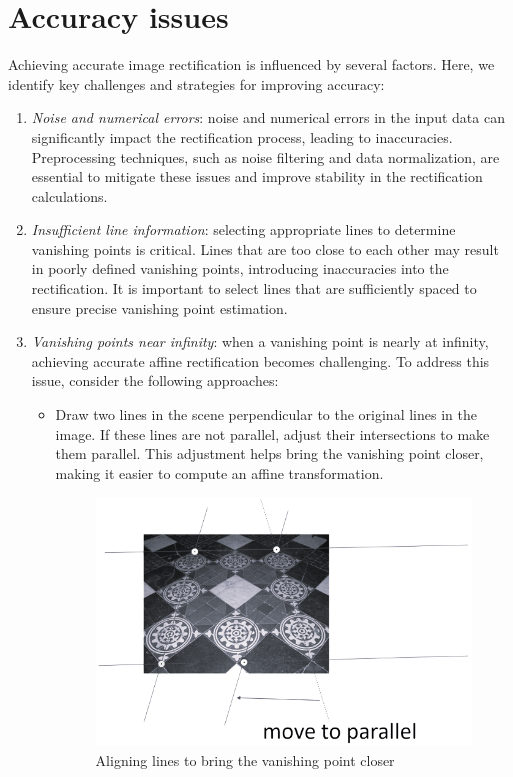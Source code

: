 \section{Accuracy issues}

Achieving accurate image rectification is influenced by several factors. 
Here, we identify key challenges and strategies for improving accuracy:
\begin{enumerate} 
    \item \textit{Noise and numerical errors}: noise and numerical errors in the input data can significantly impact the rectification process, leading to inaccuracies. 
        Preprocessing techniques, such as noise filtering and data normalization, are essential to mitigate these issues and improve stability in the rectification calculations.
    \item \textit{Insufficient line information}: selecting appropriate lines to determine vanishing points is critical. Lines that are too close to each other may result in poorly defined vanishing points, introducing inaccuracies into the rectification. 
        It is important to select lines that are sufficiently spaced to ensure precise vanishing point estimation.
    \item \textit{Vanishing points near infinity}: when a vanishing point is nearly at infinity, achieving accurate affine rectification becomes challenging. 
        To address this issue, consider the following approaches:
        \begin{itemize}
            \item Draw two lines in the scene perpendicular to the original lines in the image. 
            If these lines are not parallel, adjust their intersections to make them parallel.
            This adjustment helps bring the vanishing point closer, making it easier to compute an affine transformation.
            \begin{figure}[H]
                \centering
                \includegraphics[width=0.4\linewidth]{images/vpi.png}
                \caption{Aligning lines to bring the vanishing point closer}
            \end{figure}

\end{itemize}
\end{enumerate}
